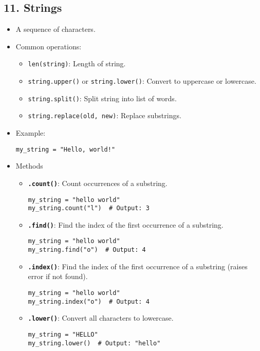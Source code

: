 \subsection*{11. Strings}
\begin{itemize}
    \item A sequence of characters.
    \item Common operations:
    \begin{itemize}
        \item \texttt{len(string)}: Length of string.
        \item \texttt{string.upper()} or \texttt{string.lower()}: Convert to uppercase or lowercase.
        \item \texttt{string.split()}: Split string into list of words.
        \item \texttt{string.replace(old, new)}: Replace substrings.
    \end{itemize}
    \item Example:
    \begin{verbatim}
my_string = "Hello, world!"
    \end{verbatim}
    \item Methods
\begin{itemize}
    \item \textbf{\texttt{.count()}}: Count occurrences of a substring.
    \begin{verbatim}
my_string = "hello world"
my_string.count("l")  # Output: 3
    \end{verbatim}

    \item \textbf{\texttt{.find()}}: Find the index of the first occurrence of a substring.
    \begin{verbatim}
my_string = "hello world"
my_string.find("o")  # Output: 4
    \end{verbatim}

    \item \textbf{\texttt{.index()}}: Find the index of the first occurrence of a substring (raises error if not found).
    \begin{verbatim}
my_string = "hello world"
my_string.index("o")  # Output: 4
    \end{verbatim}

    \item \textbf{\texttt{.lower()}}: Convert all characters to lowercase.
    \begin{verbatim}
my_string = "HELLO"
my_string.lower()  # Output: "hello"
    \end{verbatim}


\end{itemize}
\end{itemize}

